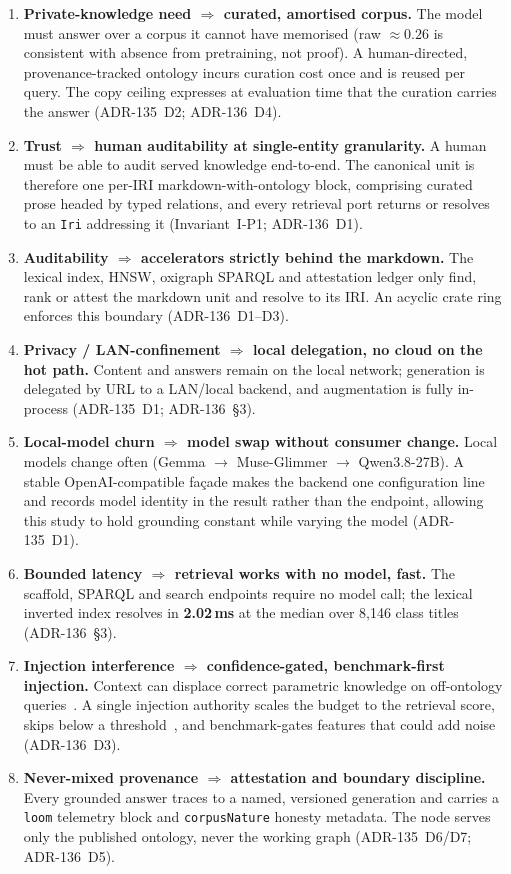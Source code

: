 \documentclass[10pt,twocolumn]{article}
\begin{document}
\begin{enumerate}[topsep=3pt,itemsep=2pt,leftmargin=1.5em]
\item \textbf{Private-knowledge need $\Rightarrow$ curated, amortised corpus.} The model must
answer over a corpus it cannot have memorised (raw $\approx0.26$ is consistent with absence from
pretraining, not proof). A human-directed, provenance-tracked ontology incurs curation cost once
and is reused per query. The copy ceiling expresses at evaluation time that the curation carries
the answer (ADR-135~D2; ADR-136~D4).
\item \textbf{Trust $\Rightarrow$ human auditability at single-entity granularity.} A human must
be able to audit served knowledge end-to-end. The canonical unit is therefore one per-IRI
markdown-with-ontology block, comprising curated prose headed by typed relations, and every
retrieval port returns or resolves to an \texttt{Iri} addressing it (Invariant~I-P1; ADR-136~D1).
\item \textbf{Auditability $\Rightarrow$ accelerators strictly behind the markdown.} The lexical
index, HNSW, oxigraph SPARQL and attestation ledger only find, rank or attest the markdown unit and
resolve to its IRI. An acyclic crate ring enforces this boundary (ADR-136~D1--D3).
\item \textbf{Privacy / LAN-confinement $\Rightarrow$ local delegation, no cloud on the hot path.}
Content and answers remain on the local network; generation is delegated by URL to a LAN/local
backend, and augmentation is fully in-process (ADR-135~D1; ADR-136~\S3).
\item \textbf{Local-model churn $\Rightarrow$ model swap without consumer change.} Local models
change often (Gemma $\to$ Muse-Glimmer $\to$ Qwen3.8-27B). A stable OpenAI-compatible façade makes
the backend one configuration line and records model identity in the result rather than the
endpoint, allowing this study to hold grounding constant while varying the model (ADR-135~D1).
\item \textbf{Bounded latency $\Rightarrow$ retrieval works with no model, fast.} The scaffold,
SPARQL and search endpoints require no model call; the lexical inverted index resolves in
\textbf{2.02\,ms} at the median over 8{,}146 class titles (ADR-136~\S3).
\item \textbf{Injection interference $\Rightarrow$ confidence-gated, benchmark-first injection.}
Context can displace correct parametric knowledge on off-ontology
queries~\cite{shi2023distracted,yoran2024robust,longpre2021entity}. A single injection authority
scales the budget to the retrieval score, skips below a threshold~\cite{mallen2023trust}, and
benchmark-gates features that could add noise (ADR-136~D3).
\item \textbf{Never-mixed provenance $\Rightarrow$ attestation and boundary discipline.} Every
grounded answer traces to a named, versioned generation and carries a \texttt{loom} telemetry block
and \texttt{corpusNature} honesty metadata. The node serves only the published ontology, never the
working graph (ADR-135~D6/D7; ADR-136~D5).
\end{enumerate}
\end{document}
